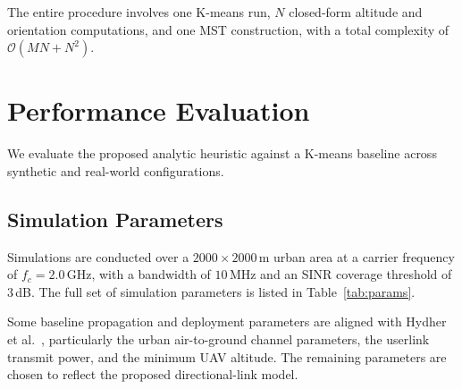 \documentclass[conference]{IEEEtran}
\begin{document}
The entire procedure involves one K-means run, $N$ closed-form altitude and orientation computations, and one MST construction, with a total complexity of $\mathcal{O}(MN + N^2)$.

%
%


\section{Performance Evaluation}
We evaluate the proposed analytic heuristic against a K-means baseline across synthetic and real-world configurations.

\subsection{Simulation Parameters}
\label{sec:setup}

Simulations are conducted over a $2000 \times 2000$\,m urban area at a carrier frequency of $f_c = 2.0$\,GHz, with a bandwidth of $10$\,MHz and an SINR coverage threshold of $3$\,dB. The full set of simulation parameters is listed in Table~\ref{tab:params}.

Some baseline propagation and deployment parameters are aligned with Hydher et al.~\cite{hydher2020}, particularly the urban air-to-ground channel parameters, the userlink transmit power, and the minimum UAV altitude. The remaining parameters are chosen to reflect the proposed directional-link model.
\end{document}
